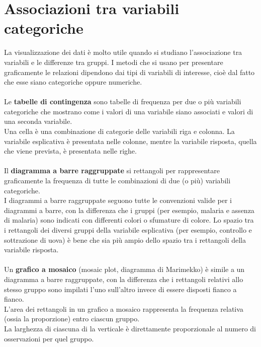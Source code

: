 \documentclass[drafts, 10pt]{book}
\begin{document}
\section{Associazioni tra variabili categoriche}
La visualizzazione dei dati è molto utile quando si studiano l'associazione tra variabili e le differenze tra gruppi. I metodi che si usano per presentare graficamente le relazioni dipendono dai tipi di variabili di interesse, cioè dal fatto che esse siano categoriche oppure numeriche.
\\
\\
Le \textbf{tabelle di contingenza} sono tabelle di frequenza per due o più variabili categoriche che mostrano come i valori di una variabile siano associati e valori di una seconda variabile. 
\\
Una cella è una combinazione di categorie delle variabili riga e colonna. La variabile esplicativa è presentata nelle colonne, mentre la variabile risposta, quella che viene prevista, è presentata nelle righe. 
\\
\\
Il \textbf{diagramma a barre raggruppate} si rettangoli per rappresentare graficamente la frequenza di tutte le combinazioni di due (o più) variabili categoriche.
\\
I diagrammi a barre raggruppate seguono tutte le convenzioni valide per i diagrammi a barre, con la differenza che i gruppi (per esempio, malaria e assenza di malaria) sono indicati con differenti colori o sfumature di colore.  Lo spazio tra i rettangoli dei diversi gruppi della variabile esplicativa (per esempio, controllo e sottrazione di uova) è bene che sia più ampio dello spazio tra i rettangoli della variabile risposta.
\\
\\
Un \textbf{grafico a mosaico} (mosaic plot, diagramma di Marimekko) è simile a un diagramma a barre raggruppate, con la differenza che i rettangoli relativi allo stesso gruppo sono impilati l'uno sull'altro invece di essere disposti fianco a fianco.
\\
L'area dei rettangoli in un grafico a mosaico rappresenta la frequenza relativa (ossia la proporzione) entro ciascun gruppo.
\\
La larghezza di ciascuna di la verticale è direttamente proporzionale al numero di osservazioni per quel gruppo.
\end{document}
